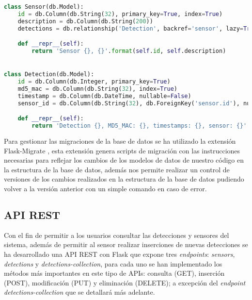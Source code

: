 \documentclass[../proyecto.tex]{subfiles}
\begin{document}
\begin{minipage}{\linewidth}
\begin{lstlisting}[language=Python, caption=Definición de modelos utilizando SQLAlchemy, label={lst:sqlalchemy_models}, captionpos=b, frame=single]
class Sensor(db.Model):
    id = db.Column(db.String(32), primary_key=True, index=True)
    description = db.Column(db.String(200))
    detections = db.relationship('Detection', backref='sensor', lazy=True)

    def __repr__(self):
        return 'Sensor {}, {}'.format(self.id, self.description)


class Detection(db.Model):
    id = db.Column(db.Integer, primary_key=True)
    md5_mac = db.Column(db.String(32), index=True)
    timestamp = db.Column(db.DateTime, nullable=False)
    sensor_id = db.Column(db.String(32), db.ForeignKey('sensor.id'), nullable=False)

    def __repr__(self):
        return 'Detection {}, MD5_MAC: {}, timestamps: {}, sensor: {}'.format(self.id, self.md5_mac, self.timestamp, self.sensor_id)
\end{lstlisting}
\end{minipage}

Para gestionar las migraciones de la base de datos se ha utilizado la extensión Flask-Migrate \cite{flask_migrate}, esta extensión genera scripts de migración con las instrucciones necesarias para reflejar los cambios de los modelos de datos de nuestro código en la estructura de la base de datos, además nos permite realizar un control de versiones de los cambios realizados en la estructura de la base de datos pudiendo volver a la versión anterior con un simple comando en caso de error.\\

\subsection{API REST}
Con el fin de permitir a los usuarios consultar las detecciones y sensores del sistema, además de permitir al sensor realizar inserciones de nuevas detecciones se ha desarrollado una API REST con Flask que expone tres \textit{endpoints}: \textit{sensors}, \textit{detections} y \textit{detections-collection}, para cada uno se han implementado los métodos más importantes en este tipo de APIs: consulta (GET), inserción (POST), modificación (PUT) y eliminación (DELETE); a excepción del \textit{endpoint detections-collection} que se detallará más adelante.\\
\end{document}
